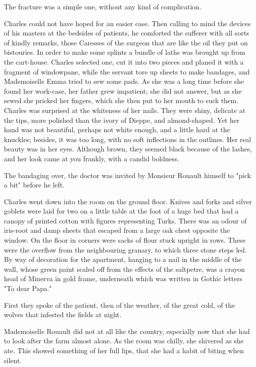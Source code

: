 \documentclass[11pt,twocolumn]{ltugboat}
\begin{document}
The fracture was a simple one, without any kind of complication.

Charles could not have hoped for an easier case. Then calling to mind
the devices of his masters at the bedsides of patients, he comforted the
sufferer with all sorts of kindly remarks, those Caresses of the surgeon
that are like the oil they put on bistouries. In order to make some
splints a bundle of laths was brought up from the cart-house. Charles
selected one, cut it into two pieces and planed it with a fragment
of windowpane, while the servant tore up sheets to make bandages, and
Mademoiselle Emma tried to sew some pads. As she was a long time before
she found her work-case, her father grew impatient; she did not answer,
but as she sewed she pricked her fingers, which she then put to her
mouth to suck them. Charles was surprised at the whiteness of her nails.
They were shiny, delicate at the tips, more polished than the ivory of
Dieppe, and almond-shaped. Yet her hand was not beautiful, perhaps not
white enough, and a little hard at the knuckles; besides, it was too
long, with no soft inflections in the outlines. Her real beauty was in
her eyes. Although brown, they seemed black because of the lashes, and
her look came at you frankly, with a candid boldness.

The bandaging over, the doctor was invited by Monsieur Rouault himself
to "pick a bit" before he left.

Charles went down into the room on the ground floor. Knives and forks
and silver goblets were laid for two on a little table at the foot of a
huge bed that had a canopy of printed cotton with figures representing
Turks. There was an odour of iris-root and damp sheets that escaped
from a large oak chest opposite the window. On the floor in corners were
sacks of flour stuck upright in rows. These were the overflow from
the neighbouring granary, to which three stone steps led. By way of
decoration for the apartment, hanging to a nail in the middle of the
wall, whose green paint scaled off from the effects of the saltpetre,
was a crayon head of Minerva in gold frame, underneath which was written
in Gothic letters "To dear Papa."

First they spoke of the patient, then of the weather, of the great cold,
of the wolves that infested the fields at night.

Mademoiselle Rouault did not at all like the country, especially now
that she had to look after the farm almost alone. As the room was
chilly, she shivered as she ate. This showed something of her full lips,
that she had a habit of biting when silent.
\end{document}
